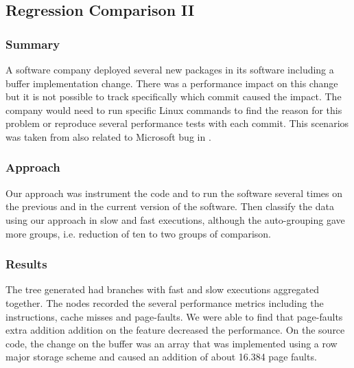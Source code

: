 \subsection{Regression Comparison II}
    
\subsubsection{Summary}
    A software company deployed several new packages in its software including a buffer implementation change. There was a performance impact on this change but it is not possible to track specifically which commit caused the impact. The company would need to run specific Linux commands to find the reason for this problem or reproduce several performance tests with each commit. This scenarios was taken from \cite{essentials} also related to Microsoft bug in \cite{microsoft_bug}.
    
\subsubsection{Approach}
    Our approach was instrument the code and to run the software several times on the previous and in the current version of the software. Then classify the data using our approach in slow and fast executions, although the auto-grouping gave more groups, i.e. reduction of ten to two groups of comparison.
  
\subsubsection{Results}
      The tree generated had branches with fast and slow executions aggregated together. The nodes recorded the several performance metrics including the instructions, cache misses and page-faults.
      We were able to find that page-faults extra addition addition on the feature decreased the performance.
      On the source code, the change on the buffer was an array that was implemented using a row major storage scheme and caused an addition of about 16.384 page faults.
      
      

